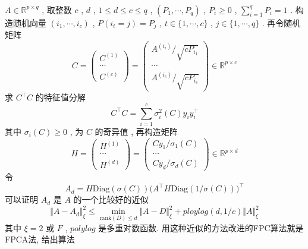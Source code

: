 \documentclass[UTF8]{ctexart}
\newcommand{\Real}[1]{\mathbb{R}^{#1}}
\numberwithin{equation}{section}
\begin{document}
		\paragraph{}\quad $A \in \Real{p \times q}$ , 取整数 $c$ , $d$ , $1 \le d \le c \le q$ , $(P_1, \cdots, P_q)$ , $P_i \ge 0$ , $\sum^{q}_{i = 1}P_i = 1$ . 构造随机向量 $(i_1, \cdots, i_c)$ , $P(i_t = j) = P_j$ , $t \in \{1, \cdots, c\}$ , $j \in \{1, \cdots, q\}$ . 再令随机矩阵
		\begin{equation}
			C = 
			\begin{pmatrix}
				C^{(1)} \\ \cdots \\ C^{(c)}
			\end{pmatrix}
			=
			\begin{pmatrix}
				A^{(i_i)}/\sqrt{c P_{i_1}} \\ \cdots \\ A^{(i_c)}/\sqrt{c P_{i_c}}
			\end{pmatrix}
			\in \Real{p \times c}
		\end{equation}
		求 $C ^\top C$ 的特征值分解
		\begin{equation}
			C ^\top C = \sum^{c}_{i = 1}\sigma_i^2(C) y_i y_i^\top
		\end{equation}
		其中 $\sigma_i(C) \ge 0$ , 为 $C$ 的奇异值 , 再构造矩阵
		\begin{equation}
			H = 
			\begin{pmatrix}
				H^{(1)} \\ \cdots \\ H^{(d)}
			\end{pmatrix}
			=
			\begin{pmatrix}
				Cy_1/\sigma_1(C) \\ \cdots \\ Cy_d/\sigma_d(C)
			\end{pmatrix}
			\in \Real{p \times d}
		\end{equation}
		令
			\begin{equation}
				A_d = H \text{Diag}(\sigma(C)) \big(A ^\top H \text{Diag}(1/\sigma(C))\big)^\top
			\end{equation}
		可以证明 $A_d$ 是 $A$ 的一个比较好的近似
			\begin{equation}
				\Vert{A - A_d}\Vert^2_\xi \le \min_{\text{rank}(D) \le d} \Vert{A - D}\Vert^2_\xi + ploylog(d, 1/c) \Vert{A}\Vert^2_\xi
			\end{equation}
		其中 $\xi = 2 \text{ 或 } F$ , $polylog$ 是多重对数函数. 用这种近似的方法改进的FPC算法就是FPCA法, 给出算法
\end{document}
